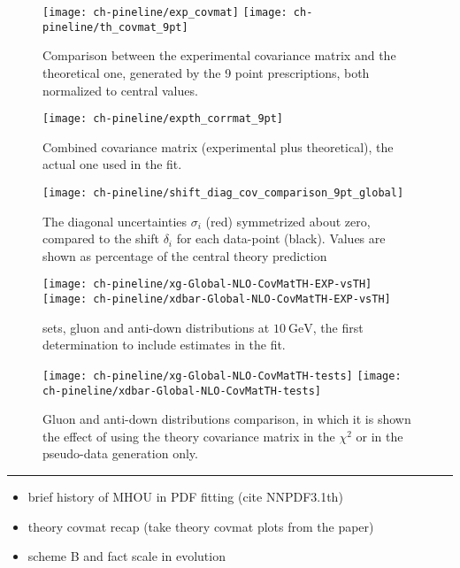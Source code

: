 
\begin{figure}
	\centering
	\texttt{[image: ch-pineline/exp\_covmat]}
	\texttt{[image: ch-pineline/th\_covmat\_9pt]}
	\caption{
		Comparison between the experimental covariance matrix and the
		theoretical one, generated by the 9 point prescriptions, both
		normalized to central values.
	}
	\label{fig:pine/covmats}
\end{figure}

\begin{figure}
	\centering
	\texttt{[image: ch-pineline/expth\_corrmat\_9pt]}
	\caption{
		Combined covariance matrix (experimental plus theoretical), the actual
		one used in the  fit.
	}
	\label{fig:pine/combined-covmat}
\end{figure}

\begin{figure}
	\centering
	\texttt{[image: ch-pineline/shift\_diag\_cov\_comparison\_9pt\_global]}
	\caption{
		The diagonal uncertainties $\sigma_i$ (red) symmetrized about zero,
		compared to the shift $\delta_i$ for each data-point (black).
		Values are shown as percentage of the central theory prediction
	}
	\label{fig:pine/scvar-shifts}
\end{figure}

\begin{figure}
	\centering
	\texttt{[image: ch-pineline/xg-Global-NLO-CovMatTH-EXP-vsTH]}
	\texttt{[image: ch-pineline/xdbar-Global-NLO-CovMatTH-EXP-vsTH]}
	\caption{
		 \nlo sets, gluon and anti-down distributions at
		$\SI{10}{\giga\electronvolt}$, the first \pdf determination to include
		\mhou estimates in the fit.
	}
	\label{fig:pine/3.1th}
\end{figure}

\begin{figure}
	\centering
	\texttt{[image: ch-pineline/xg-Global-NLO-CovMatTH-tests]}
	\texttt{[image: ch-pineline/xdbar-Global-NLO-CovMatTH-tests]}
	\caption{
		Gluon and anti-down distributions comparison, in which it is shown the
		effect of using the theory covariance matrix in the $\chi^2$ or in the
		pseudo-data generation only.
	}
	\label{fig:pine/3.1th-tests}
\end{figure}


\vspace*{20pt}
\noindent
\rule{\hsize}{1pt}

\begin{itemize}
	\item brief history of MHOU in PDF fitting (cite NNPDF3.1th)
	\item theory covmat recap (take theory covmat plots from the paper)
	\item scheme B and fact scale in evolution
\end{itemize}
